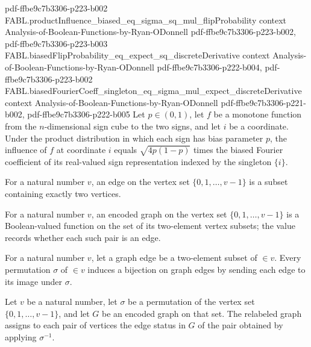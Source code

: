 \begin{theorem}
  {pdf-ffbe9c7b3306-p223-b002}
\proofstep
  {FABL.productInfluence_biased_eq_sigma_sq_mul_flipProbability}
  {context}
  {Analysis-of-Boolean-Functions-by-Ryan-ODonnell}
  {pdf-ffbe9c7b3306-p223-b002,
    pdf-ffbe9c7b3306-p223-b003}
\proofstep
  {FABL.biasedFlipProbability_eq_expect_sq_discreteDerivative}
  {context}
  {Analysis-of-Boolean-Functions-by-Ryan-ODonnell}
  {pdf-ffbe9c7b3306-p222-b004,
    pdf-ffbe9c7b3306-p223-b002}
\proofstep
  {FABL.biasedFourierCoeff_singleton_eq_sigma_mul_expect_discreteDerivative}
  {context}
  {Analysis-of-Boolean-Functions-by-Ryan-ODonnell}
  {pdf-ffbe9c7b3306-p221-b002,
    pdf-ffbe9c7b3306-p222-b005}
Let $p\in(0,1)$, let $f$ be a monotone function from the $n$-dimensional sign cube to
the two signs, and let $i$ be a coordinate. Under the product distribution in which each
sign has bias parameter $p$, the influence of $f$ at coordinate $i$ equals
$\sqrt{4p(1-p)}$ times the biased Fourier coefficient of its real-valued sign
representation indexed by the singleton $\{i\}$.
\end{theorem}

\begin{definition}
\label{FABL.GraphEdge}
\leanok
For a natural number $v$, an edge on the vertex set $\{0,1,\ldots,v-1\}$ is a subset
containing exactly two vertices.
\end{definition}

\begin{definition}
\label{FABL.EncodedGraph}
\leanok
{}
For a natural number $v$, an encoded graph on the vertex set $\{0,1,\ldots,v-1\}$ is a
Boolean-valued function on the set of its two-element vertex subsets; the value records
whether each such pair is an edge.
\end{definition}

\begin{definition}
\label{FABL.graphEdgePermEquiv}
\leanok
{}
For a natural number $v$, let a graph edge be a two-element subset of $\in{v}$. Every
permutation $\sigma$ of $\in{v}$ induces a bijection on graph edges by sending each edge
to its image under $\sigma$.
\end{definition}

\begin{definition}
\label{FABL.permuteEncodedGraph}
\leanok
{}
Let $v$ be a natural number, let $\sigma$ be a permutation of the vertex set
$\{0,1,\ldots,v-1\}$, and let $G$ be an encoded graph on that set. The relabeled graph
assigns to each pair of vertices the edge status in $G$ of the pair obtained by applying
$\sigma^{-1}$.
\end{definition}

